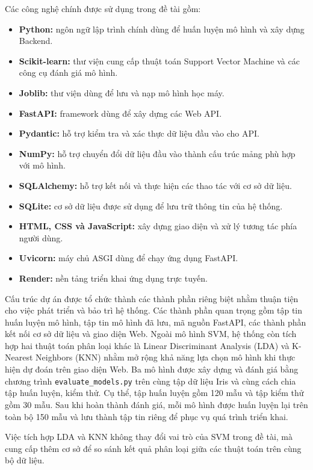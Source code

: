 \documentclass[14pt]{extarticle}
\begin{document}
	\noindent Các công nghệ chính được sử dụng trong đề tài gồm:
	
	\begin{itemize}[leftmargin=*]
		\item \textbf{Python:} ngôn ngữ lập trình chính dùng để huấn luyện mô hình và xây dựng Backend.
		\item \textbf{Scikit-learn:} thư viện cung cấp thuật toán Support Vector Machine và các công cụ đánh giá mô hình.
		\item \textbf{Joblib:} thư viện dùng để lưu và nạp mô hình học máy.
		\item \textbf{FastAPI:} framework dùng để xây dựng các Web API.
		\item \textbf{Pydantic:} hỗ trợ kiểm tra và xác thực dữ liệu đầu vào cho API.
		\item \textbf{NumPy:} hỗ trợ chuyển đổi dữ liệu đầu vào thành cấu trúc mảng phù hợp với mô hình.
		\item \textbf{SQLAlchemy:} hỗ trợ kết nối và thực hiện các thao tác với cơ sở dữ liệu.
		\item \textbf{SQLite:} cơ sở dữ liệu được sử dụng để lưu trữ thông tin của hệ thống.
		\item \textbf{HTML, CSS và JavaScript:} xây dựng giao diện và xử lý tương tác phía người dùng.
		\item \textbf{Uvicorn:} máy chủ ASGI dùng để chạy ứng dụng FastAPI.
		\item \textbf{Render:} nền tảng triển khai ứng dụng trực tuyến.
	\end{itemize}
	
	\noindent Cấu trúc dự án được tổ chức thành các thành phần riêng biệt nhằm thuận tiện cho việc phát triển và bảo trì hệ thống. Các thành phần quan trọng gồm tập tin huấn luyện mô hình, tập tin mô hình đã lưu, mã nguồn FastAPI, các thành phần kết nối cơ sở dữ liệu và giao diện Web.
	\noindent Ngoài mô hình SVM, hệ thống còn tích hợp hai thuật toán phân loại khác là Linear Discriminant Analysis (LDA) và K-Nearest Neighbors (KNN) nhằm mở rộng khả năng lựa chọn mô hình khi thực hiện dự đoán trên giao diện Web. Ba mô hình được xây dựng và đánh giá bằng chương trình \texttt{evaluate\_models.py} trên cùng tập dữ liệu Iris và cùng cách chia tập huấn luyện, kiểm thử. Cụ thể, tập huấn luyện gồm 120 mẫu và tập kiểm thử gồm 30 mẫu. Sau khi hoàn thành đánh giá, mỗi mô hình được huấn luyện lại trên toàn bộ 150 mẫu và lưu thành tập tin riêng để phục vụ quá trình triển khai.
	
	\noindent Việc tích hợp LDA và KNN không thay đổi vai trò của SVM trong đề tài, mà cung cấp thêm cơ sở để so sánh kết quả phân loại giữa các thuật toán trên cùng bộ dữ liệu.
	
\end{document}
